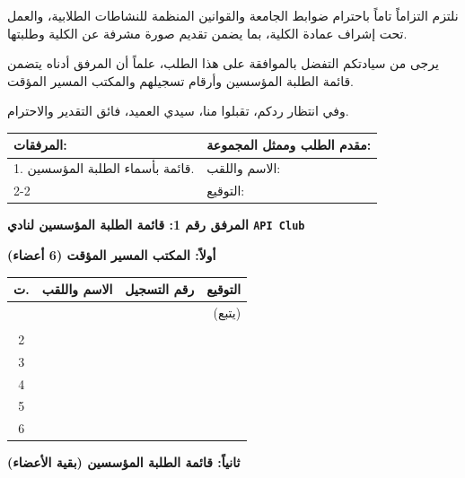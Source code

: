 \documentclass[12pt, a4paper]{article}
\begin{document}
نلتزم التزاماً تاماً باحترام ضوابط الجامعة والقوانين المنظمة للنشاطات الطلابية، والعمل تحت إشراف عمادة الكلية، بما يضمن تقديم صورة مشرفة عن الكلية وطلبتها.

يرجى من سيادتكم التفضل بالموافقة على هذا الطلب، علماً أن المرفق أدناه يتضمن قائمة الطلبة المؤسسين وأرقام تسجيلهم والمكتب المسير المؤقت.

وفي انتظار ردكم، تقبلوا منا، سيدي العميد، فائق التقدير والاحترام.

\vspace{10mm}

\begin{tabular}{|l|p{}|}
    \hline
    \textbf{المرفقات:} & \textbf{مقدم الطلب وممثل المجموعة:} \\ \hline
    1. قائمة بأسماء الطلبة المؤسسين. & الاسم واللقب: \hrulefill \\ \cline{2-2}
    & التوقيع: \hrulefill \\ \hline
\end{tabular}

\newpage

\begin{center}
    {\Large \textbf{المرفق رقم 1: قائمة الطلبة المؤسسين لنادي {\texttt{API Club}}}}
\end{center}

\vspace{3mm}

\textbf{أولاً: المكتب المسير المؤقت (6 أعضاء)}

\begin{longtable}{|c|p{}|p{}|c|}
    \hline
    \textbf{ت.} & \textbf{الاسم واللقب} & \textbf{رقم التسجيل} & \textbf{التوقيع} \\
    \hline
    \endhead
    \hline
    \multicolumn{4}{|r|}{(يتبع)} \\
    \endfoot
    \hline
    \endlastfoot
    1 & \hrulefill & \hrulefill & \\
    2 & \hrulefill & \hrulefill & \\
    3 & \hrulefill & \hrulefill & \\
    4 & \hrulefill & \hrulefill & \\
    5 & \hrulefill & \hrulefill & \\
    6 & \hrulefill & \hrulefill & \\
\end{longtable}

\vspace{5mm}

\textbf{ثانياً: قائمة الطلبة المؤسسين (بقية الأعضاء)}
\end{document}
